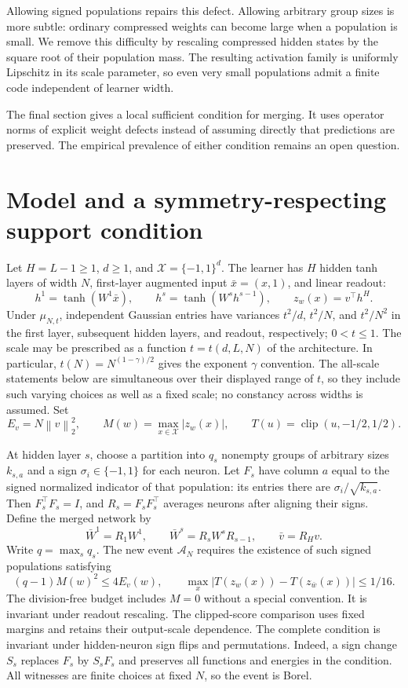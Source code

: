 \documentclass[11pt]{article}
\newcommand{\norm}[1]{\left\|#1\right\|}
\newcommand{\clip}{\operatorname{clip}}
\begin{document}
Allowing signed populations repairs this defect. Allowing arbitrary group
sizes is more subtle: ordinary compressed weights can become large when a
population is small. We remove this difficulty by rescaling compressed
hidden states by the square root of their population mass. The resulting
activation family is uniformly Lipschitz in its scale parameter, so even
very small populations admit a finite code independent of learner width.

The final section gives a local sufficient condition for merging. It uses
operator norms of explicit weight defects instead of assuming directly that
predictions are preserved. The empirical prevalence of either condition
remains an open question.

\section{Model and a symmetry-respecting support condition}

Let $H=L-1\ge1$, $d\ge1$, and $\mathcal X=\{-1,1\}^d$. The learner has
$H$ hidden tanh layers of width $N$, first-layer augmented input
$\bar x=(x,1)$, and linear readout:
\[
 h^1=\tanh(W^1\bar x),\qquad h^s=\tanh(W^sh^{s-1}),\qquad
 z_w(x)=v^\top h^H.
\]
Under $\mu_{N,t}$, independent Gaussian entries have variances
$t^2/d$, $t^2/N$, and $t^2/N^2$ in the first layer, subsequent hidden
layers, and readout, respectively; $0<t\le1$. The scale may be prescribed as a function $t=t(d,L,N)$ of the
architecture. In particular, $t(N)=N^{(1-\gamma)/2}$ gives the exponent
$\gamma$ convention. The all-scale statements below are simultaneous
over their displayed range of $t$, so they include such varying choices
as well as a fixed scale; no constancy across widths is assumed. Set
\[
 E_v=N\norm v_2^2,\qquad M(w)=\max_{x\in\mathcal X}|z_w(x)|,
 \qquad T(u)=\clip(u,-1/2,1/2).
\]

At hidden layer $s$, choose a partition into $q_s$ nonempty groups of
arbitrary sizes $k_{s,a}$ and a sign $\sigma_i\in\{-1,1\}$ for each neuron.
Let $F_s$ have column $a$ equal to the signed normalized indicator of that
population: its entries there are $\sigma_i/\sqrt{k_{s,a}}$. Then
$F_s^\top F_s=I$, and $R_s=F_sF_s^\top$ averages neurons after aligning
their signs. Define the merged network by
\begin{equation}\label{eq:projection}
 \bar W^1=R_1W^1,\qquad
 \bar W^s=R_sW^sR_{s-1},\qquad \bar v=R_Hv.
\end{equation}
Write $q=\max_s q_s$. The new event $\mathcal A_N$ requires the existence
of such signed populations satisfying
\begin{equation}\label{eq:population-condition}
 (q-1)M(w)^2\le4E_v(w),\qquad
 \max_x|T(z_w(x))-T(z_{\bar w}(x))|\le1/16.
\end{equation}
The division-free budget includes $M=0$ without a special convention.
It is invariant under readout rescaling. The clipped-score comparison uses
fixed margins and retains their output-scale dependence. The complete
condition is invariant under hidden-neuron sign flips and permutations.
Indeed, a sign change $S_s$ replaces $F_s$ by $S_sF_s$ and preserves all
functions and energies in the condition. All witnesses are finite choices
at fixed $N$, so the event is Borel.
\end{document}
